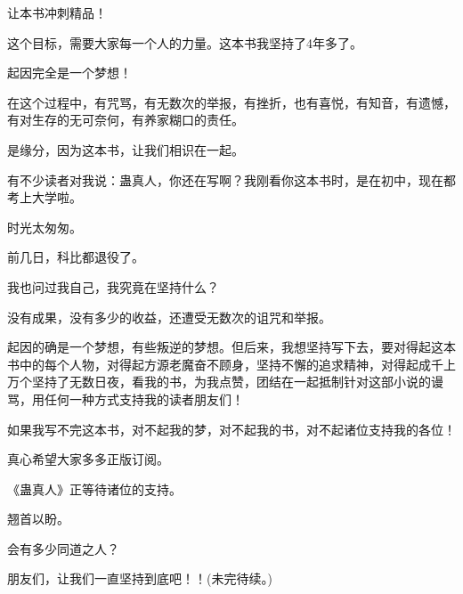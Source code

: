 \begin{this_body}
让本书冲刺精品！

这个目标，需要大家每一个人的力量。这本书我坚持了4年多了。

起因完全是一个梦想！

在这个过程中，有咒骂，有无数次的举报，有挫折，也有喜悦，有知音，有遗憾，有对生存的无可奈何，有养家糊口的责任。

是缘分，因为这本书，让我们相识在一起。

有不少读者对我说：蛊真人，你还在写啊？我刚看你这本书时，是在初中，现在都考上大学啦。

时光太匆匆。

前几日，科比都退役了。

我也问过我自己，我究竟在坚持什么？

没有成果，没有多少的收益，还遭受无数次的诅咒和举报。

起因的确是一个梦想，有些叛逆的梦想。但后来，我想坚持写下去，要对得起这本书中的每个人物，对得起方源老魔奋不顾身，坚持不懈的追求精神，对得起成千上万个坚持了无数日夜，看我的书，为我点赞，团结在一起抵制针对这部小说的谩骂，用任何一种方式支持我的读者朋友们！

如果我写不完这本书，对不起我的梦，对不起我的书，对不起诸位支持我的各位！

真心希望大家多多正版订阅。

《蛊真人》正等待诸位的支持。

翘首以盼。

会有多少同道之人？

朋友们，让我们一直坚持到底吧！！(未完待续。)

\end{this_body}

